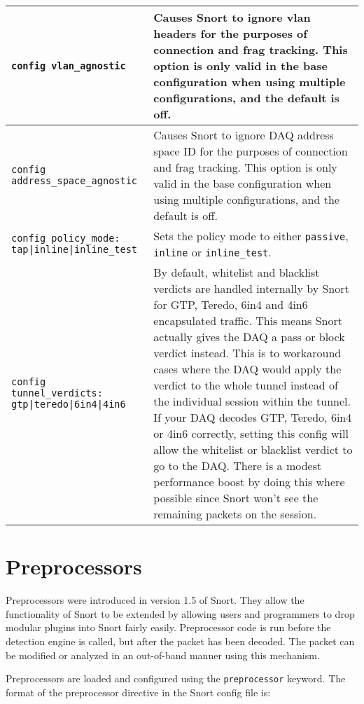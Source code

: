 \documentclass[english]{report}
\begin{document}
\begin{center}
\begin{longtable}[t]{| p{2.5in} | p{3.5in} |}
\hline
\texttt{config vlan\_agnostic} & Causes Snort to ignore vlan headers for
the purposes of connection and frag tracking.  This option is only valid in the
base configuration when using multiple configurations, and the default is off.
\\

\hline
\texttt{config address\_space\_agnostic} & Causes Snort to ignore DAQ
address space ID for the purposes of connection and frag tracking.  This option
is only valid in the base configuration when using multiple configurations, and
the default is off.  \\

\hline
\texttt{config policy\_mode: tap|inline|inline\_test} & Sets the policy
mode to either \texttt{passive}, \texttt{inline} or \texttt{inline\_test}. \\

\hline \texttt{config tunnel\_verdicts: gtp|teredo|6in4|4in6} & By default, whitelist
and blacklist verdicts are handled internally by Snort for GTP, Teredo, 6in4 and 4in6
encapsulated traffic.  This means Snort actually gives the DAQ a pass or block
verdict instead.  This is to workaround cases where the DAQ would apply
the verdict to the whole tunnel instead of the individual session within the
tunnel.  If your DAQ decodes GTP, Teredo, 6in4 or 4in6 correctly, setting this config
will allow the whitelist or blacklist verdict to go to the DAQ.  There is a
modest performance boost by doing this where possible since Snort won't see the
remaining packets on the session. \\

\hline
\end{longtable}
\end{center}

\section{Preprocessors}

Preprocessors were introduced in version 1.5 of Snort. They allow the
functionality of Snort to be extended by allowing users and programmers to drop
modular plugins into Snort fairly easily.  Preprocessor code is run before the
detection engine is called, but after the packet has been decoded. The packet
can be modified or analyzed in an out-of-band manner using this mechanism.

Preprocessors are loaded and configured using the {\tt preprocessor} keyword.
The format of the preprocessor directive in the Snort config file is:
\end{document}

